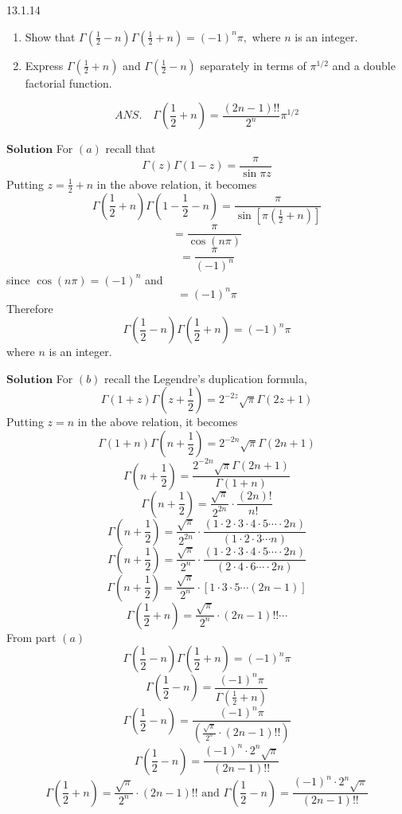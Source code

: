 \newpage

\begin{mybox}{13.1.14}
\begin{enumerate}[$(a)$]
\item Show that $\Gamma\left(\frac{1}{2}-n\right) \Gamma\left(\frac{1}{2}+n\right)=(-1)^{n} \pi,$ where $n$ is an integer. 
\item Express $\Gamma\left(\frac{1}{2}+n\right)$ and $\Gamma\left(\frac{1}{2}-n\right)$ separately in terms of $\pi^{1 / 2}$ and a double factorial function.
\end{enumerate}
$$
A N S . \quad \Gamma\left(\frac{1}{2}+n\right)=\frac{(2 n-1) ! !}{2^{n}} \pi^{1 / 2}
$$
\end{mybox}

$\boxed{\textbf{Solution}}$ For $(a)$ recall that 
$$\Gamma(z) \Gamma(1-z)=\frac{\pi}{\sin \pi z}$$
Putting $z=\frac{1}{2}+n$ in the above relation, it becomes
$$
\Gamma\left(\frac{1}{2}+n\right) \Gamma\left(1-\frac{1}{2}-n\right)=\frac{\pi}{\sin \left[\pi\left(\frac{1}{2}+n\right)\right]}
$$
$$
=\frac{\pi}{\cos (n \pi)}
$$
$$
=\frac{\pi}{(-1)^{n}}
$$
since $\cos (n \pi)=(-1)^{n}$ and
$$
=(-1)^{n} \pi
$$
Therefore 
$$\Gamma\left(\frac{1}{2}-n\right) \Gamma\left(\frac{1}{2}+n\right)=(-1)^{n} \pi$$ where $n$ is an integer.

$\boxed{\textbf{Solution}}$ For $(b)$ recall the Legendre's duplication formula,
$$\Gamma(1+z) \Gamma\left(z+\frac{1}{2}\right)=2^{-2 z} \sqrt{\pi} \Gamma(2 z+1)$$
Putting $z=n$ in the above relation, it becomes
$$\Gamma(1+n) \Gamma\left(n+\frac{1}{2}\right)=2^{-2 n} \sqrt{\pi} \Gamma(2 n+1)$$
$$\Gamma\left(n+\frac{1}{2}\right)=\frac{2^{-2 n} \sqrt{\pi} \Gamma(2 n+1)}{\Gamma(1+n)}$$
$$\Gamma\left(n+\frac{1}{2}\right)=\frac{\sqrt{\pi}}{2^{2 n}} \cdot \frac{(2 n) !}{n! \ }$$
$$\Gamma\left(n+\frac{1}{2}\right)=\frac{\sqrt{\pi}}{2^{2 n}} \cdot \frac{(1 \cdot 2  \cdot 3  \cdot 4  \cdot 5   \cdots   \cdot 2 n)}{(1 \cdot 2  \cdot 3  \cdots n)}$$
$$\Gamma\left(n+\frac{1}{2}\right)=\frac{\sqrt{\pi}}{2^{n}} \cdot \frac{(1 \cdot 2  \cdot 3  \cdot 4  \cdot 5   \cdots   \cdot 2 n)}{(2 \cdot 4  \cdot 6   \cdots   \cdot 2 n)}$$
$$\Gamma\left(n+\frac{1}{2}\right)=\frac{\sqrt{\pi}}{2^{n}} \cdot[1 \cdot 3  \cdot 5   \cdots (2 n-1)]$$
$$
\Gamma\left(\frac{1}{2}+n\right)=\frac{\sqrt{\pi}}{2^{n}} \cdot(2 n-1) ! ! \cdots
$$
From part $(a)$ 
$$
\Gamma\left(\frac{1}{2}-n\right) \Gamma\left(\frac{1}{2}+n\right)=(-1)^{n} \pi
$$
$$\Gamma\left(\frac{1}{2}-n\right)=\frac{(-1)^{n} \pi}{\Gamma\left(\frac{1}{2}+n\right)}$$
$$\Gamma\left(\frac{1}{2}-n\right)=\frac{(-1)^{n} \pi}{\left(\frac{\sqrt{\pi}}{2^{n}} \cdot(2 n-1) ! !\right)}$$
$$
\Gamma\left(\frac{1}{2}-n\right)=\frac{(-1)^{n} \cdot 2^{n} \sqrt{\pi}}{(2 n-1) ! !}
$$
$$
\Gamma\left(\frac{1}{2}+n\right)=\frac{\sqrt{\pi}}{2^{n}} \cdot(2 n-1) ! ! \text { and } \Gamma\left(\frac{1}{2}-n\right)=\frac{(-1)^{n} \cdot 2^{n} \sqrt{\pi}}{(2 n-1) ! !}
$$

